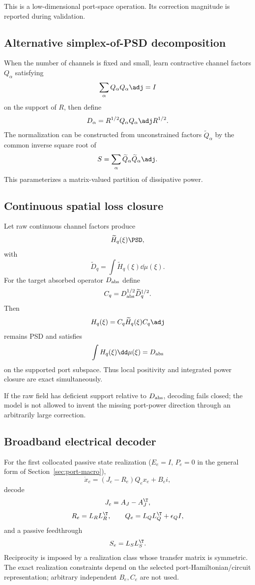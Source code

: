 This is a low-dimensional port-space operation. Its correction magnitude is
reported during validation.

\subsection{Alternative simplex-of-PSD decomposition}

When the number of channels is fixed and small, learn contractive channel
factors $Q_\alpha$ satisfying
\[
 \sum_\alpha Q_\alpha Q_\alpha\adj=I
\]
on the support of $R$, then define
\[
 D_\alpha
 =
 R^{1/2}Q_\alpha Q_\alpha\adj R^{1/2}.
\]
The normalization can be constructed from unconstrained factors
$\widetilde Q_\alpha$ by the common inverse square root of
\[
 S=\sum_\alpha\widetilde Q_\alpha\widetilde Q_\alpha\adj.
\]
This parameterizes a matrix-valued partition of dissipative power.

\subsection{Continuous spatial loss closure}

Let raw continuous channel factors produce
\[
 \widetilde H_q(\xi)\PSD,
\]
with
\[
 \widetilde D_q
 =
 \int\widetilde H_q(\xi)\dd\mu(\xi).
\]
For the target absorbed operator $D_{\rm abs}$ define
\[
 C_q
 =
 D_{\rm abs}^{1/2}
 \widetilde D_q^{\dagger/2}.
\]
Then
\[
 H_q(\xi)
 =
 C_q\widetilde H_q(\xi)C_q\adj
\]
remains PSD and satisfies
\[
 \int H_q(\xi)\dd\mu(\xi)
 =
 D_{\rm abs}
\]
on the supported port subspace. Thus local positivity and integrated power
closure are exact simultaneously.

If the raw field has deficient support relative to $D_{\rm abs}$, decoding
fails closed; the model is not allowed to invent the missing port-power
direction through an arbitrarily large correction.

\subsection{Broadband electrical decoder}

For the first collocated passive state realization
($E_e=I$, $P_e=0$ in the general form of
Section~\ref{sec:port-macro}),
\[
 \dot x_e=(J_e-R_e)Q_e x_e+B_ei,
\]
decode
\[
 J_e=A_J-A_J^\T,
\]
\[
 R_e=L_RL_R^\T,
 \qquad
 Q_e=L_QL_Q^\T+\epsilon_QI,
\]
and a passive feedthrough
\[
 S_e=L_SL_S^\T.
\]
Reciprocity is imposed by a realization class whose transfer matrix is
symmetric. The exact realization constraints depend on the selected
port-Hamiltonian/circuit representation; arbitrary independent $B_e,C_e$ are
not used.

